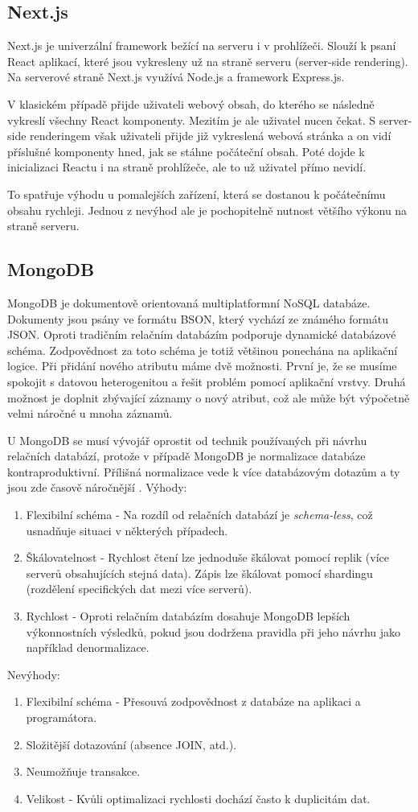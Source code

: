 \documentclass[thesis=M,czech]{FITthesis}[2018/10/20]
\begin{document}
\newpage
	\subsection{Next.js}
Next.js je univerzální framework bežící na serveru i v prohlížeči. Slouží k psaní React aplikací, které jsou vykresleny už na straně serveru (server-side rendering). Na serverové straně Next.js využívá Node.js a framework Express.js.

V klasickém případě přijde uživateli webový obsah, do kterého se následně vykreslí všechny React komponenty. Mezitím je ale uživatel nucen čekat. S server-side renderingem však uživateli přijde již vykreslená webová stránka a on vidí příslušné komponenty hned, jak se stáhne počáteční obsah. Poté dojde k inicializaci Reactu i na straně prohlížeče, ale to už uživatel přímo nevidí. 

To spatřuje výhodu u pomalejších zařízení, která se dostanou k počátečnímu obsahu rychleji. Jednou z nevýhod ale je pochopitelně nutnost většího výkonu na straně serveru.
	\subsection{MongoDB}
MongoDB je dokumentově orientovaná multiplatformní NoSQL databáze. Dokumenty jsou psány ve formátu BSON, který vychází ze známého formátu JSON. Oproti tradičním relačním databázím podporuje dynamické databázové schéma. Zodpovědnost za toto schéma je totiž většinou ponechána na aplikační logice. Při přidání nového atributu máme dvě možnosti. První je, že se musíme spokojit s datovou heterogenitou a řešit problém pomocí aplikační vrstvy. Druhá možnost je doplnit zbývající záznamy o nový atribut, což ale může být výpočetně velmi náročné u mnoha záznamů. 

U MongoDB se musí vývojář oprostit od technik používaných při návrhu relačních databází, protože v případě MongoDB je normalizace databáze kontraproduktivní. Přílišná normalizace vede k více databázovým dotazům a ty jsou zde časově náročnější \cite{mongodb}.
\bigbreak
Výhody:
\begin{enumerate}
\item Flexibilní schéma - Na rozdíl od relačních databází je \textit{schema-less}, což usnadňuje situaci v některých případech.
\item Škálovatelnost - Rychlost čtení lze jednoduše škálovat pomocí replik (více serverů obsahujících stejná data). Zápis lze škálovat pomocí shardingu (rozdělení specifických dat mezi více serverů).
\item Rychlost - Oproti relačním databázím dosahuje MongoDB lepších  výkonnostních výsledků, pokud jsou dodržena pravidla při jeho návrhu jako například denormalizace.
\end{enumerate}
\newpage
Nevýhody:
\begin{enumerate}
\item Flexibilní schéma - Přesouvá zodpovědnost z databáze na aplikaci a programátora.
\item Složitější dotazování (absence JOIN, atd.).
\item Neumožňuje transakce.
\item Velikost - Kvůli optimalizaci rychlosti dochází často k duplicitám dat.
\end{enumerate}
\end{document}
